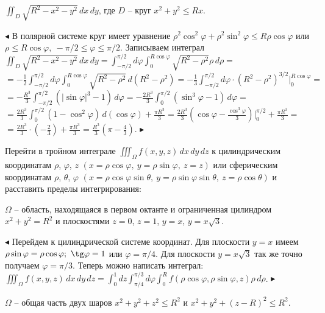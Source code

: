 \documentclass[a5paper,10pt]{article}
\begin{document}
\medskip
{} $\displaystyle \iint_D\sqrt{R^2-x^2-y^2}\,dx\,dy$, где $D$ -- круг $x^2+y^2\le Rx$.

\smallskip
\noindent $\blacktriangleleft$ В полярной системе круг имеет уравнение
$\rho^2\cos^2\varphi+\rho^2\sin^2\varphi\le R\rho\cos\varphi$
или $\rho\le R\cos\varphi,\ -\pi/2\le\varphi\le\pi/2$. Записываем интеграл\\
$\displaystyle \iint_D\sqrt{R^2-x^2-y^2}\,dx\,dy=
\int_{-\pi/2}^{\pi/2}d\varphi\int_0^{R\cos\varphi}\sqrt{R^2-\rho^2}\rho\,d\rho=$\\
$\displaystyle =-\frac12\int_{-\pi/2}^{\pi/2}d\varphi\int_0^{R\cos\varphi}\sqrt{R^2-\rho^2}\,d(R^2-\rho^2)=
-\frac13\int_{-\pi/2}^{\pi/2}d\varphi\cdot (R^2-\rho^2)^{3/2}\Big|_0^{R\cos\varphi}=$\\
$\displaystyle =-\frac{R^3}{3}\int_{-\pi/2}^{\pi/2}(|\sin\varphi|^3-1)\,d\varphi=
-\frac{2R^3}{3}\int_{0}^{\pi/2}(\sin^3\varphi-1)\,d\varphi=$\\
$\displaystyle =\frac{2R^3}{3}\int_{0}^{\pi/2}(1-\cos^2\varphi)\,d(\cos\varphi)+\frac{\pi R^3}{3}=
\frac{2R^3}{3}\left(\cos\varphi-\frac{\cos^3\varphi}{3}\right)\Big|_{0}^{\pi/2}+\frac{\pi R^3}{3}=$\\
$\displaystyle =\frac{2R^3}{3}\cdot \left(-\frac{2}{3}\right)+\frac{\pi R^3}{3}=
\frac{R^3}{3}\left(\pi-\frac43\right)$. $\blacktriangleright$

\medskip
\noindent Перейти в тройном интеграле $\displaystyle\iiint_\Omega f(x,y,z)\,dx\,dy\,dz$
к цилиндрическим координатам
$\rho$, $\varphi$,  $z$ $(x=\rho\cos\varphi,\ y=\rho\sin\varphi,\ z=z)$ или сферическим координатам
$\rho$, $\theta$, $\varphi$ $(x=\rho\cos\varphi\sin\theta,\ y=
\rho\sin\varphi\sin\theta,\ z=\rho\cos\theta)$
и расставить пределы интегрирования:

\medskip
{} $\Omega$ -- область, находящаяся в первом октанте и ограниченная цилиндром
$x^2+y^2=R^2$ и плоскостями $z=0$, $z=1$, $y=x$, $y=x\sqrt3$.

\smallskip
\noindent $\blacktriangleleft$ Перейдем к цилиндрической системе координат. Для плоскости $y=x$
имеем $\rho\sin\varphi=\rho\cos\varphi;\ \tg\varphi=1$ или $\varphi=\pi/4$.
Для плоскости $y=x\sqrt3$ так же точно получаем $\varphi=\pi/3$.
Теперь можно написать интеграл:\\
$\displaystyle\iiint_\Omega f(x,y,z)\,dx\,dy\,dz=\int_0^1dz\int_{\pi/4}^{\pi/3}d\varphi
\int_0^Rf(\rho\cos\varphi,\rho\sin\varphi,z)\rho\,d\rho$. $\blacktriangleright$ 

\medskip
{} $\Omega$ -- общая часть двух шаров $x^2+y^2+z^2\le R^2$ и $x^2+y^2+(z-R)^2\le R^2$.
\end{document}
